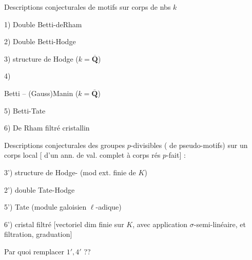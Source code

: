 Descriptions conjecturales de motifs sur corps de nbs  $k$

1) Double  Betti-deRham

2) Double  Betti-Hodge

3)  structure de Hodge ($k=\overline{\mathbf Q}$)

4) 

Betti -- (Gauss)Manin \qquad ($k=\overline{\mathbf Q}$)

5)  Betti-Tate

6)  De Rham filtré cristallin

Descriptions conjecturales des groupes $p$-divisibles  ( de pseudo-motifs) sur un corps local [ d'un ann. de val.  complet à corps rés $p$-fait] :

3') structure de Hodge- (mod ext. finie de $K$)

2') double  Tate-Hodge

5') Tate (module galoisien $\ell$-adique)

6')  cristal filtré [vectoriel  dim finie sur $K$, avec application $\sigma$-semi-linéaire, et filtration, graduation]

Par quoi remplacer $1',4'$ ??

